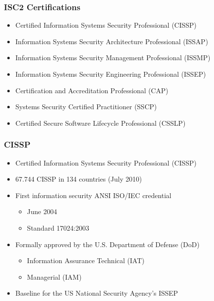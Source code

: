 \documentclass{beamer}
\begin{document}

\begin{frame}
\frametitle{ISC2 Certifications}
\begin{itemize}
    \item Certified Information Systems Security Professional (CISSP)
    \item Information Systems Security Architecture Professional (ISSAP)
    \item Information Systems Security Management Professional (ISSMP)
    \item Information Systems Security Engineering Professional (ISSEP)
    \item Certification and Accreditation Professional (CAP)
    \item Systems Security Certified Practitioner (SSCP)
    \item Certified Secure Software Lifecycle Professional (CSSLP)
\end{itemize}
\end{frame}


\begin{frame}
\frametitle{CISSP}
\begin{itemize}
    \item Certified Information Systems Security Professional (CISSP)
    \item 67.744 CISSP in 134 countries (July 2010)
    \item First information security ANSI ISO/IEC credential 
       \begin{itemize}
       \item June 2004 
       \item Standard 17024:2003
       \end{itemize}
    \item Formally approved by the U.S. Department of Defense (DoD)
       \begin{itemize}
       \item Information Assurance Technical (IAT) 
       \item Managerial (IAM) 
       \end{itemize}
    \item Baseline for the US National Security Agency's ISSEP
\end{itemize}
\end{frame}

\end{document}
